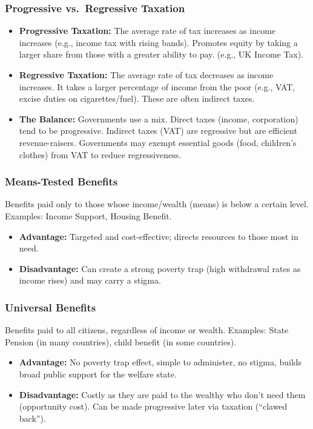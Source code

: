 \documentclass[11pt, a4paper, twoside]{book}
\begin{document}
\subsubsection{Progressive vs.\ Regressive Taxation}

\begin{itemize}
  \item \textbf{Progressive Taxation:} The average rate of tax increases as income increases (e.g., income tax with rising bands). Promotes equity by taking a larger share from those with a greater ability to pay. (e.g., UK Income Tax).
  \item \textbf{Regressive Taxation:} The average rate of tax decreases as income increases. It takes a larger percentage of income from the poor (e.g., VAT, excise duties on cigarettes/fuel). These are often indirect taxes.
  \item \textbf{The Balance:} Governments use a mix. Direct taxes (income, corporation) tend to be progressive. Indirect taxes (VAT) are regressive but are efficient revenue-raisers. Governments may exempt essential goods (food, children's clothes) from VAT to reduce regressiveness.
\end{itemize}

\subsubsection{Means-Tested Benefits}

Benefits paid only to those whose income/wealth (means) is below a certain level. Examples: Income Support, Housing Benefit.

\begin{itemize}
  \item \textbf{Advantage:} Targeted and cost-effective; directs resources to those most in need.
  \item \textbf{Disadvantage:} Can create a strong poverty trap (high withdrawal rates as income rises) and may carry a stigma.
\end{itemize}

\subsubsection{Universal Benefits}

Benefits paid to all citizens, regardless of income or wealth. Examples: State Pension (in many countries), child benefit (in some countries).

\begin{itemize}
  \item \textbf{Advantage:} No poverty trap effect, simple to administer, no stigma, builds broad public support for the welfare state.
  \item \textbf{Disadvantage:} Costly as they are paid to the wealthy who don't need them (opportunity cost). Can be made progressive later via taxation (``clawed back'').
\end{itemize}
\end{document}
